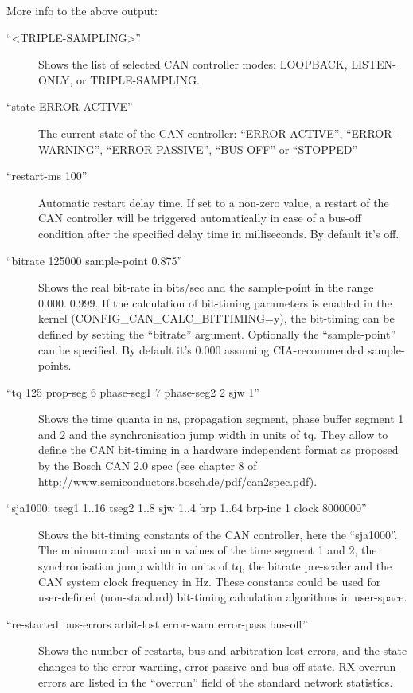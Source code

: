 \documentclass[a4paper,8pt,english]{sphinxmanual}
\begin{document}
More info to the above output:
\begin{description}
\item[{``\textless{}TRIPLE-SAMPLING\textgreater{}''}] \leavevmode
Shows the list of selected CAN controller modes: LOOPBACK,
LISTEN-ONLY, or TRIPLE-SAMPLING.

\item[{``state ERROR-ACTIVE''}] \leavevmode
The current state of the CAN controller: ``ERROR-ACTIVE'',
``ERROR-WARNING'', ``ERROR-PASSIVE'', ``BUS-OFF'' or ``STOPPED''

\item[{``restart-ms 100''}] \leavevmode
Automatic restart delay time. If set to a non-zero value, a
restart of the CAN controller will be triggered automatically
in case of a bus-off condition after the specified delay time
in milliseconds. By default it's off.

\item[{``bitrate 125000 sample-point 0.875''}] \leavevmode
Shows the real bit-rate in bits/sec and the sample-point in the
range 0.000..0.999. If the calculation of bit-timing parameters
is enabled in the kernel (CONFIG\_CAN\_CALC\_BITTIMING=y), the
bit-timing can be defined by setting the ``bitrate'' argument.
Optionally the ``sample-point'' can be specified. By default it's
0.000 assuming CIA-recommended sample-points.

\item[{``tq 125 prop-seg 6 phase-seg1 7 phase-seg2 2 sjw 1''}] \leavevmode
Shows the time quanta in ns, propagation segment, phase buffer
segment 1 and 2 and the synchronisation jump width in units of
tq. They allow to define the CAN bit-timing in a hardware
independent format as proposed by the Bosch CAN 2.0 spec (see
chapter 8 of \href{http://www.semiconductors.bosch.de/pdf/can2spec.pdf}{http://www.semiconductors.bosch.de/pdf/can2spec.pdf}).

\item[{``sja1000: tseg1 1..16 tseg2 1..8 sjw 1..4 brp 1..64 brp-inc 1 clock 8000000''}] \leavevmode
Shows the bit-timing constants of the CAN controller, here the
``sja1000''. The minimum and maximum values of the time segment 1
and 2, the synchronisation jump width in units of tq, the
bitrate pre-scaler and the CAN system clock frequency in Hz.
These constants could be used for user-defined (non-standard)
bit-timing calculation algorithms in user-space.

\item[{``re-started bus-errors arbit-lost error-warn error-pass bus-off''}] \leavevmode
Shows the number of restarts, bus and arbitration lost errors,
and the state changes to the error-warning, error-passive and
bus-off state. RX overrun errors are listed in the ``overrun''
field of the standard network statistics.

\end{description}
\end{document}
